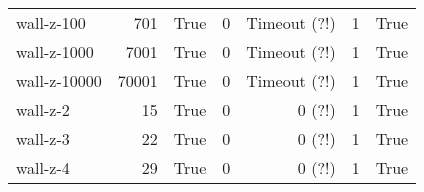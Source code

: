 \begin{longtable}{lrlrrrl}
wall-z-100 & 701 & True & 0 & Timeout (?!) & 1 & True \\

wall-z-1000 & 7001 & True & 0 & Timeout (?!) & 1 & True \\

wall-z-10000 & 70001 & True & 0 & Timeout (?!) & 1 & True \\

wall-z-2 & 15 & True & 0 & 0 (?!) & 1 & True \\

wall-z-3 & 22 & True & 0 & 0 (?!) & 1 & True \\

wall-z-4 & 29 & True & 0 & 0 (?!) & 1 & True \\

\end{longtable}